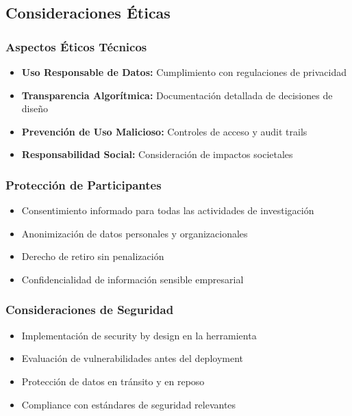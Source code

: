 \subsection{Consideraciones Éticas}

\subsubsection{Aspectos Éticos Técnicos}
\begin{itemize}
    \item \textbf{Uso Responsable de Datos:} Cumplimiento con regulaciones de privacidad
    \item \textbf{Transparencia Algorítmica:} Documentación detallada de decisiones de diseño
    \item \textbf{Prevención de Uso Malicioso:} Controles de acceso y audit trails
    \item \textbf{Responsabilidad Social:} Consideración de impactos societales
\end{itemize}

\subsubsection{Protección de Participantes}
\begin{itemize}
    \item Consentimiento informado para todas las actividades de investigación
    \item Anonimización de datos personales y organizacionales
    \item Derecho de retiro sin penalización
    \item Confidencialidad de información sensible empresarial
\end{itemize}

\subsubsection{Consideraciones de Seguridad}
\begin{itemize}
    \item Implementación de security by design en la herramienta
    \item Evaluación de vulnerabilidades antes del deployment
    \item Protección de datos en tránsito y en reposo
    \item Compliance con estándares de seguridad relevantes
\end{itemize}
